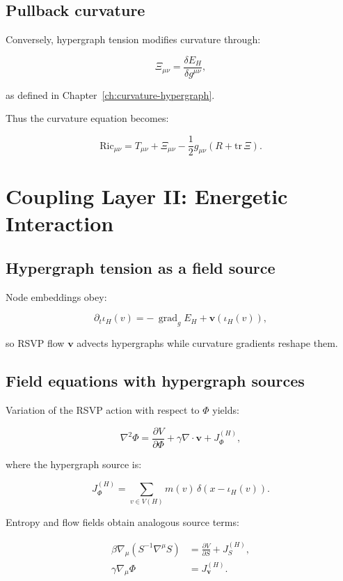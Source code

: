 \subsection{Pullback curvature}

Conversely, hypergraph tension modifies curvature through:

\[
\Xi_{\mu\nu}
=
\frac{\delta E_H}{\delta g^{\mu\nu}},
\]

as defined in Chapter~\ref{ch:curvature-hypergraph}.

Thus the curvature equation becomes:

\[
\mathrm{Ric}_{\mu\nu}
=
T_{\mu\nu}
+
\Xi_{\mu\nu}
-
\frac{1}{2}g_{\mu\nu}(R+\mathrm{tr}\,\Xi).
\]


\section{Coupling Layer II: Energetic Interaction}

\subsection{Hypergraph tension as a field source}

Node embeddings obey:

\[
\partial_t \iota_H(v)
=
-\,\operatorname{grad}_g E_H
+
\mathbf{v}(\iota_H(v)),
\]

so RSVP flow $\mathbf{v}$ advects hypergraphs while curvature gradients reshape them.

\subsection{Field equations with hypergraph sources}

Variation of the RSVP action with respect to $\Phi$ yields:

\[
\nabla^2 \Phi 
=
\frac{\partial V}{\partial \Phi}
+
\gamma \nabla\cdot \mathbf{v}
+
J_\Phi^{(H)},
\]

where the hypergraph source is:

\[
J_\Phi^{(H)}
=
\sum_{v\in V(H)}
m(v)\, \delta(x-\iota_H(v)).
\]

Entropy and flow fields obtain analogous source terms:

\begin{align*}
\beta\nabla_\mu(S^{-1}\nabla^\mu S) &= \frac{\partial V}{\partial S} + J_S^{(H)}, \\
\gamma \nabla_\mu \Phi &= J_{\mathbf{v}}^{(H)}.
\end{align*}

